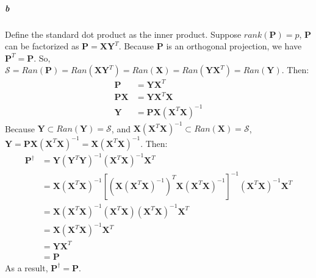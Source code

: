 \documentclass[22pt]{article}
\begin{document}
		\subparagraph{b} Define the standard dot product as the inner product. Suppose $rank( \mathbf{P}) = p$, $ \mathbf{P}$ can be factorized as $ \mathbf{P} =  \mathbf{X} \mathbf{Y}^T$. Because $\mathbf{P}$ is an orthogonal projection, we have $\mathbf{P}^T = \mathbf{P}$. So, $\mathcal{S} = Ran(\mathbf{P})  = Ran(\mathbf{XY}^T) = Ran(\mathbf{X}) = Ran(\mathbf{YX}^T) = Ran(\mathbf{Y})$. Then:
		\begin{align}
			\mathbf{P} & = \mathbf{YX}^T\\
			\mathbf{PX} & = \mathbf{YX}^T\mathbf{X}\\
			\mathbf{Y} & = \mathbf{PX}(\mathbf{X}^T\mathbf{X})^{-1}
		\end{align}
		Because $\mathbf{Y} \subset Ran(\mathbf{Y}) = \mathcal{S}$, and $ \mathbf{X}(\mathbf{X}^T\mathbf{X})^{-1} \subset Ran(\mathbf{X}) = \mathcal{S}$, $\mathbf{Y}  = \mathbf{PX}(\mathbf{X}^T\mathbf{X})^{-1}  = \mathbf{X}(\mathbf{X}^T\mathbf{X})^{-1}$. Then: 
		\begin{align}
			\mathbf{P}^\dagger & = \mathbf{Y}(\mathbf{Y}^T\mathbf{Y})^{-1}(\mathbf{X}^T\mathbf{X})^{-1}\mathbf{X}^T\\
			& = \mathbf{X}(\mathbf{X}^T\mathbf{X})^{-1}[(\mathbf{X}(\mathbf{X}^T\mathbf{X})^{-1})^T\mathbf{X}(\mathbf{X}^T\mathbf{X})^{-1}]^{-1}(\mathbf{X}^T\mathbf{X})^{-1}\mathbf{X}^T\\
			& = \mathbf{X}(\mathbf{X}^T\mathbf{X})^{-1}(\mathbf{X}^T\mathbf{X})(\mathbf{X}^T\mathbf{X})^{-1}\mathbf{X}^T\\
			& = \mathbf{X}(\mathbf{X}^T\mathbf{X})^{-1}\mathbf{X}^T\\
			& = \mathbf{YX}^T\\
			& = \mathbf{P}
		\end{align}
		As a result, $\mathbf{P}^\dagger = \mathbf{P}$.
 
\end{document}
